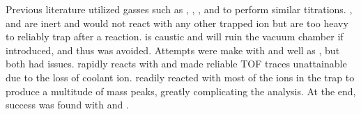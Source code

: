 Previous literature utilized gasses such as , , , and  to perform similar titrations. , and  are inert and would not react with any other trapped ion but are too heavy to reliably trap after a reaction.  is caustic and will ruin the vacuum chamber if introduced, and thus was avoided. Attempts were make with  and well as , but both had issues.  rapidly reacts with  and made reliable TOF traces unattainable due to the loss of coolant ion.  readily reacted with most of the ions in the trap to produce a multitude of mass peaks, greatly complicating the analysis. At the end, success was found with  and .
